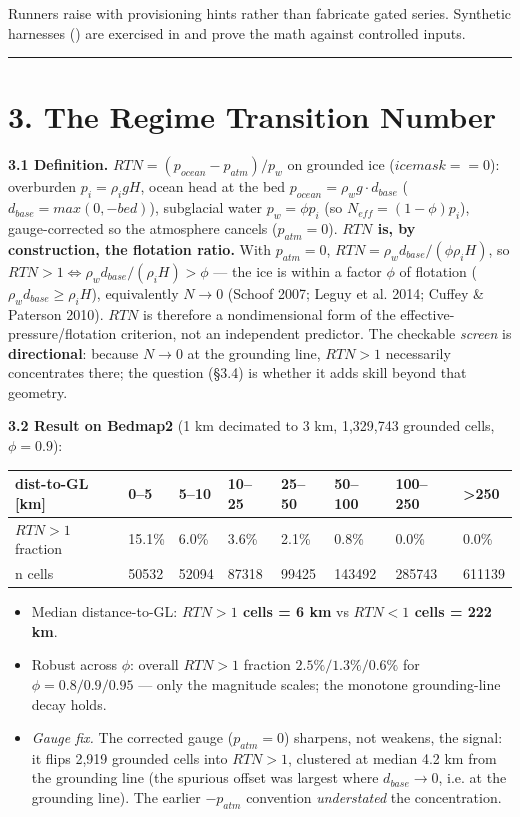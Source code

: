 \documentclass[11pt]{article}
\begin{document}
Runners raise  with provisioning hints rather than fabricate gated series. Synthetic harnesses () are exercised in  and prove the math against controlled inputs.


\medskip\hrule\medskip


\section*{3. The Regime Transition Number}


\textbf{3.1 Definition.} $RTN = (p_{ocean} - p_{atm})/p_{w}$ on grounded ice ($icemask==0$): overburden $p_{i}=\rho _{i} g H$, ocean head at the bed $p_{ocean}=\rho _{w} g\cdot d_{base}$ ($d_{base}=max(0,-bed)$), subglacial water $p_{w}=\phi  p_{i}$ (so $N_{eff}=(1-\phi )p_{i}$), gauge-corrected so the atmosphere cancels ($p_{atm}=0$). \textbf{$RTN$ is, by construction, the flotation ratio.} With $p_{atm}=0$, $RTN = \rho _{w} d_{base}/(\phi  \rho _{i} H)$, so $RTN>1 \iff  \rho _{w} d_{base}/(\rho _{i} H) > \phi $ — the ice is within a factor $\phi $ of flotation ($\rho _{w} d_{base} \ge  \rho _{i} H$), equivalently $N\to 0$ (Schoof 2007; Leguy et al. 2014; Cuffey \& Paterson 2010). $RTN$ is therefore a nondimensional form of the effective-pressure/flotation criterion, not an independent predictor. The checkable \emph{screen} is \textbf{directional}: because $N\to 0$ at the grounding line, $RTN>1$ necessarily concentrates there; the question (§3.4) is whether it adds skill beyond that geometry.


\textbf{3.2 Result on Bedmap2} (1 km decimated to 3 km, 1,329,743 grounded cells, $\phi =0.9$):


\begin{center}\small
\begin{tabular}{llllllll}
\toprule
dist-to-GL [km] & 0–5 & 5–10 & 10–25 & 25–50 & 50–100 & 100–250 & >250 \\
\midrule
$RTN>1$ fraction & 15.1\% & 6.0\% & 3.6\% & 2.1\% & 0.8\% & 0.0\% & 0.0\% \\
n cells & 50532 & 52094 & 87318 & 99425 & 143492 & 285743 & 611139 \\
\bottomrule
\end{tabular}
\end{center}


\begin{itemize}
\item Median distance-to-GL: \textbf{$RTN>1$ cells = 6 km} vs \textbf{$RTN<1$ cells = 222 km}.
\item Robust across $\phi $: overall $RTN>1$ fraction $2.5\% / 1.3\% / 0.6\%$ for $\phi =0.8/0.9/0.95$ — only the magnitude scales; the monotone grounding-line decay holds.
\item \emph{Gauge fix.} The corrected gauge ($p_{atm}=0$) sharpens, not weakens, the signal: it flips 2,919 grounded cells into $RTN>1$, clustered at median 4.2 km from the grounding line (the spurious offset was largest where $d_{base}\to 0$, i.e. at the grounding line). The earlier $-p_{atm}$ convention \emph{understated} the concentration.
\end{itemize}
\end{document}
